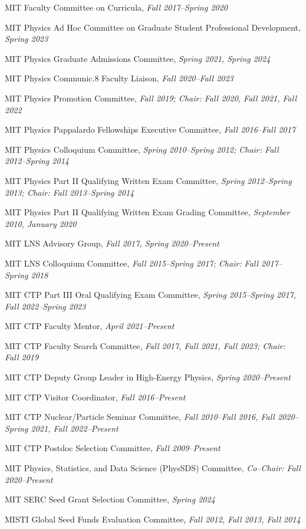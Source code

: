 \bbl
\item MIT Faculty Committee on Curricula, \emph{Fall 2017--Spring 2020}
\item MIT Physics Ad Hoc Committee on Graduate Student Professional Development, \emph{Spring 2023}
\item MIT Physics Graduate Admissions Committee, \emph{Spring 2021, Spring 2024}
\item MIT Physics Communic.8 Faculty Liaison, \emph{Fall 2020--Fall 2023}
\item MIT Physics Promotion Committee, \emph{Fall 2019; Chair: Fall 2020, Fall 2021, Fall 2022}
\item MIT Physics Pappalardo Fellowships Executive Committee, \emph{Fall 2016--Fall 2017}
\item MIT Physics Colloquium Committee, \emph{Spring 2010--Spring 2012; Chair: Fall 2012--Spring 2014}
\item MIT Physics Part II Qualifying Written Exam Committee, \emph{Spring 2012--Spring 2013; Chair: Fall 2013--Spring 2014}
\item MIT Physics Part II Qualifying Written Exam Grading Committee, \emph{September 2010, January 2020}
\item MIT LNS Advisory Group, \emph{Fall 2017, Spring 2020--Present}
\item MIT LNS Colloquium Committee, \emph{Fall 2015--Spring 2017; Chair: Fall 2017--Spring 2018}
\item MIT CTP Part III Oral Qualifying Exam Committee, \emph{Spring 2015--Spring 2017, Fall 2022--Spring 2023}
\item MIT CTP Faculty Mentor, \emph{April 2021--Present}
\item MIT CTP Faculty Search Committee, \emph{Fall 2017, Fall 2021, Fall 2023; Chair: Fall 2019}
\item MIT CTP Deputy Group Leader in High-Energy Physics, \emph{Spring 2020--Present}
\item MIT CTP Visitor Coordinator, \emph{Fall 2016--Present}
\item MIT CTP Nuclear/Particle Seminar Committee, \emph{Fall 2010--Fall 2016, Fall 2020--Spring 2021, Fall 2022--Present}
\item MIT CTP Postdoc Selection Committee, \emph{Fall 2009--Present}
\item MIT Physics, Statistics, and Data Science (PhysSDS) Committee, \emph{Co--Chair: Fall 2020--Present}
\item MIT SERC Seed Grant Selection Committee, \emph{Spring 2024}
\item MISTI Global Seed Funds Evaluation Committee, \emph{Fall 2012, Fall 2013, Fall 2014}
\el
